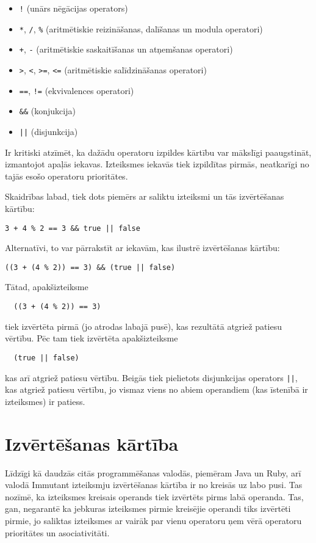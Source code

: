 \documentclass[12pt,a4paper]{report}
\begin{document}
\begin{itemize}
  \item \texttt{!} (unārs nēgācijas operators)
  \item \texttt{*}, \texttt{/}, \texttt{\%} (aritmētiskie reizināšanas, dalīšanas un modula operatori)
  \item \texttt{+}, \texttt{-} (aritmētiskie saskaitīšanas un atņemšanas operatori)
  \item \texttt{>}, \texttt{<}, \texttt{>=}, \texttt{<=} (aritmētiskie salīdzināšanas operatori)
  \item \texttt{==}, \texttt{!=} (ekvivalences operatori)
  \item \texttt{\&\&} (konjukcija)
  \item \texttt{||} (disjunkcija) 
\end{itemize}

Ir kritiski atzīmēt, ka dažādu operatoru izpildes kārtību var mākslīgi paaugstināt, izmantojot apaļās iekavas. Izteiksmes iekavās tiek izpildītas pirmās, neatkarīgi no tajās esošo operatoru prioritātes.

Skaidrības labad, tiek dots piemērs ar saliktu izteiksmi un tās izvērtēšanas kārtību:
\begin{verbatim}
3 + 4 % 2 == 3 && true || false
\end{verbatim}

Alternatīvi, to var pārrakstīt ar iekavām, kas ilustrē izvērtēšanas kārtību:
\begin{verbatim}
((3 + (4 % 2)) == 3) && (true || false)
\end{verbatim}

Tātad, apakšizteiksme 
\begin{verbatim}
  ((3 + (4 % 2)) == 3)
\end{verbatim}
tiek izvērtēta pirmā (jo atrodas labajā pusē), kas rezultātā atgriež patiesu vērtību.
Pēc tam tiek izvērtēta apakšizteiksme
\begin{verbatim}  (true || false)
\end{verbatim}
kas arī atgriež patiesu vērtību. Beigās tiek pielietots disjunkcijas operators \texttt{||}, kas atgriež patiesu vērtību, jo vismaz viens no abiem operandiem (kas īstenībā ir izteiksmes) ir patiess.

\section{Izvērtēšanas kārtība}
Līdzīgi kā daudzās citās programmēšanas valodās, piemēram Java un Ruby, arī valodā Immutant izteiksmju izvērtēšanas kārtība ir no kreisās uz labo pusi. Tas nozīmē, ka izteiksmes kreisais operands tiek izvērtēts pirms labā operanda. Tas, gan, negarantē ka jebkuras izteiksmes pirmie kreisējie operandi tiks izvērtēti pirmie, jo saliktas izteiksmes ar vairāk par vienu operatoru ņem vērā operatoru prioritātes un asociativitāti.
\end{document}
